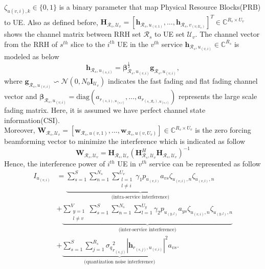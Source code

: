 \documentclass[conference]{IEEEtran}
\begin{document}
$\zeta_{u(v,i),k} \in \{0,1\}$ is a binary parameter that map Physical Resource Blocks(PRB) to UE.
Also as defined before, $\boldsymbol{H}_{\mathcal{R}_s,\mathcal{U}_v}=\left[\boldsymbol{h}_{\mathcal{R}_s,u_{(v,1)}},\ldots,\boldsymbol{h}_{\mathcal{R}_s,v_{(v,\mathcal{U}_v)}}\right]^T  \in \mathbb{C}^{{R}_s\times {U}_v }$ 
shows the channel matrix between RRH set $\mathcal{R}_s$ to UE set
$\mathcal{U}_v$. 
The channel vector from the RRH of  $s^{th}$ slice to the $i^{th}$ UE in the $v^{th}$ service $\boldsymbol{h}_{\mathcal{R}_s,u_{(v,i)}}\in \mathbb{C}^{{R}_s}$ is modeled as below
\begin{equation}
\boldsymbol{h}_{\mathcal{R}_s,u_{(s,i)}} = \boldsymbol{\beta}^\frac{1}{2}_{\mathcal{R}_s,u_{(v,i)}} \boldsymbol{g}_{\mathcal{R}_s,u_{(v,i)}},
\end{equation}
where $\boldsymbol{g}_{\mathcal{R}_s,u_{(v,i)}} \backsim \mathcal{N}(0,N_0\boldsymbol{I}_{\mathcal{U}_v})$ indicates the fast fading and flat fading channel vector and $\boldsymbol{\beta}_{\mathcal{R}_s,u_{(v,i)}}=\text{diag}(a_{r_{(s,1),u_{(v,i)}}},\ldots,a_{r_{(s,\mathcal{R}_s),u_{(v,i)}}})$
represents the large scale fading matrix. Here, it is assumed we have perfect channel state information(CSI).
\\
Moreover, $\boldsymbol{W}_{\mathcal{R}_s,\mathcal{U}_v} = [\boldsymbol{w}_{\mathcal{R}_s,u(v,1)},...,\boldsymbol{w}_{\mathcal{R}_s,u(v,U_v)}] \in \mathbb{C}^{{R}_s\times U_v} $ is the zero forcing beamforming vector to minimize the interference which is indicated as follow
\begin{equation}
\boldsymbol{W}_{\mathcal{R}_s,\mathcal{U}_v} = \boldsymbol{H}_{\mathcal{R}_s,\mathcal{U}_v}(\boldsymbol{H}_{\mathcal{R}_s,\mathcal{U}_v}^H \boldsymbol{H}_{\mathcal{R}_s,\mathcal{U}_v})^{-1}
\end{equation}
Hence, the interference power of $i^{th}$ UE in $v^{th}$ service can be represented as follow
\begin{equation}
\begin{split}
 I_{u_{(v,i)}} &= 
 \underbrace{\sum_{s=1}^{S}\sum_{n=1}^{N_s}\sum_{\substack{l=1 \\ l\neq i}}^{{U}_v} \gamma_{1}  p_{u_{(v,l)}}a_{vs}\zeta_{u_(v,i),n}\zeta_{u_(v,l),n}}_{\text{(intra-service interference)}}\\
&+ \underbrace{\sum_{\substack{y=1 \\ l\neq v}}^{V}\sum_{s=1}^{S}\sum_{n=1}^{N_s}\sum_{l=1}^{{U}_y} \gamma_{2}  p_{u_{(y,l)}}a_{ys} \zeta_{u_(v,i),n}\zeta_{u_(y,l),n}}_{\text{(inter-service interference)}}\\
&+\underbrace{ \sum_{s=1}^{S} \sum_{j=1}^{{R}_s} {\sigma_q}_{r_{(s,j)}}^2 |\boldsymbol{h}_{r_{(s,j)}, u_{(v,i)}}|^2 a_{vs}}_{\text{(quantization noise interference)}}.
\end{split}
\end{equation}
\end{document}
